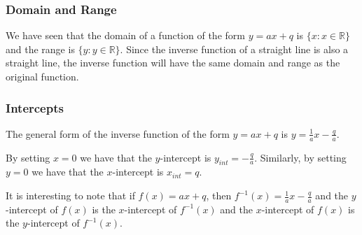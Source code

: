 \subsubsection{Domain and Range}
We have seen that the domain of a function of the form $y=ax+q$ is $\{x:x\in\mathbb{R}\}$ and the range is $\{y:y\in\mathbb{R}\}$. Since the inverse function of a straight line is also a straight line, the inverse function will have the same domain and range as the original function.

\subsubsection{Intercepts}
The general form of the inverse function of the form $y=ax+q$ is $y=\frac{1}{a}x-\frac{q}{a}$.

By setting $x=0$ we have that the $y$-intercept is $y_{int}=-\frac{q}{a}$. Similarly, by setting $y=0$ we have that the $x$-intercept is $x_{int}=q$.

It is interesting to note that if $f(x)=ax+q$, then $f^{-1}(x)=\frac{1}{a}x-\frac{q}{a}$ and the $y$-intercept of $f(x)$ is the $x$-intercept of $f^{-1}(x)$ and the $x$-intercept of $f(x)$ is the $y$-intercept of $f^{-1}(x)$.

